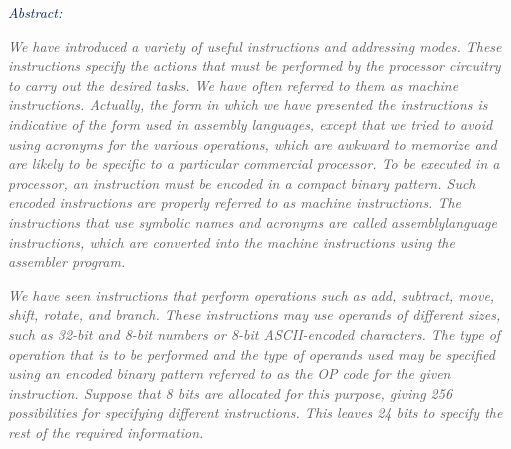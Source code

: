 \documentclass[12pt]{article}
\begin{document}
\vspace{\baselineskip}

\vspace{\baselineskip}

\vspace{\baselineskip}

\vspace{\baselineskip}

\vspace{\baselineskip}
{\fontsize{36pt}{43.2pt}\selectfont \textit{\textcolor[HTML]{002060}{Abstract:}}\par}\par

{\fontsize{16pt}{19.2pt}\selectfont \textit{\textcolor[HTML]{595959}{We have introduced a variety of useful instructions and addressing modes. These instructions specify the actions that must be performed by the processor circuitry to carry out the desired tasks. We have often referred to them as machine instructions. Actually, the form in which we have presented the instructions is indicative of the form used in assembly languages, except that we tried to avoid using acronyms for the various operations, which are awkward to memorize and are likely to be specific to a particular commercial processor. To be executed in a processor, an instruction must be encoded in a compact binary pattern. Such encoded instructions are properly referred to as machine instructions. The instructions that use symbolic names and acronyms are called assemblylanguage instructions, which are converted into the machine instructions using the assembler program.}}\par}\par

{\fontsize{16pt}{19.2pt}\selectfont \textit{\textcolor[HTML]{595959}{We have seen instructions that perform operations such as add, subtract, move, shift, rotate, and branch. These instructions may use operands of different sizes, such as 32-bit and 8-bit numbers or 8-bit ASCII-encoded characters. The type of operation that is to be performed and the type of operands used may be specified using an encoded binary pattern referred to as the OP code for the given instruction. Suppose that 8 bits are allocated for this purpose, giving 256 possibilities for specifying different instructions. This leaves 24 bits to specify the rest of the required information.}}\par}\par


\vspace{\baselineskip}
\end{document}
